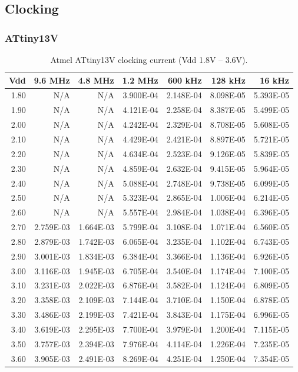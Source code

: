 \subsection{Clocking}


\subsubsection{ATtiny13V}

\begin{table}
\begin{centering}
\begin{tabular}{|r|r|r|r|r|r|r|}
\hline
Vdd  & 9.6 MHz  & 4.8 MHz  & 1.2 MHz  & 600 kHz  & 128 kHz  & 16 kHz\tabularnewline
\hline
1.80  & N/A  & N/A  & 3.900E-04  & 2.148E-04  & 8.098E-05  & 5.393E-05 \tabularnewline
1.90  & N/A  & N/A  & 4.121E-04  & 2.258E-04  & 8.387E-05  & 5.499E-05 \tabularnewline
2.00  & N/A  & N/A  & 4.242E-04  & 2.329E-04  & 8.708E-05  & 5.608E-05 \tabularnewline
2.10  & N/A  & N/A  & 4.429E-04  & 2.421E-04  & 8.897E-05  & 5.721E-05 \tabularnewline
2.20  & N/A  & N/A  & 4.634E-04  & 2.523E-04  & 9.126E-05  & 5.839E-05 \tabularnewline
2.30  & N/A  & N/A  & 4.859E-04  & 2.632E-04  & 9.415E-05  & 5.964E-05 \tabularnewline
2.40  & N/A  & N/A  & 5.088E-04  & 2.748E-04  & 9.738E-05  & 6.099E-05 \tabularnewline
2.50  & N/A  & N/A  & 5.323E-04  & 2.865E-04  & 1.006E-04  & 6.214E-05 \tabularnewline
2.60  & N/A  & N/A  & 5.557E-04  & 2.984E-04  & 1.038E-04  & 6.396E-05 \tabularnewline
2.70  & 2.759E-03  & 1.664E-03  & 5.799E-04  & 3.108E-04  & 1.071E-04  & 6.560E-05 \tabularnewline
2.80  & 2.879E-03  & 1.742E-03  & 6.065E-04  & 3.235E-04  & 1.102E-04  & 6.743E-05 \tabularnewline
2.90  & 3.001E-03  & 1.834E-03  & 6.384E-04  & 3.366E-04  & 1.136E-04  & 6.926E-05 \tabularnewline
3.00  & 3.116E-03  & 1.945E-03  & 6.705E-04  & 3.540E-04  & 1.174E-04  & 7.100E-05 \tabularnewline
3.10  & 3.231E-03  & 2.022E-03  & 6.876E-04  & 3.582E-04  & 1.124E-04  & 6.809E-05 \tabularnewline
3.20  & 3.358E-03  & 2.109E-03  & 7.144E-04  & 3.710E-04  & 1.150E-04  & 6.878E-05 \tabularnewline
3.30  & 3.486E-03  & 2.199E-03  & 7.421E-04  & 3.843E-04  & 1.175E-04  & 6.996E-05 \tabularnewline
3.40  & 3.619E-03  & 2.295E-03  & 7.700E-04  & 3.979E-04  & 1.200E-04  & 7.115E-05 \tabularnewline
3.50  & 3.757E-03  & 2.394E-03  & 7.976E-04  & 4.114E-04  & 1.226E-04  & 7.235E-05 \tabularnewline
3.60  & 3.905E-03  & 2.491E-03  & 8.269E-04  & 4.251E-04  & 1.250E-04  & 7.354E-05 \tabularnewline
\hline
\end{tabular}
\par\end{centering}

\protect\caption{Atmel ATtiny13V clocking current (Vdd 1.8V -- 3.6V).}


\end{table}
